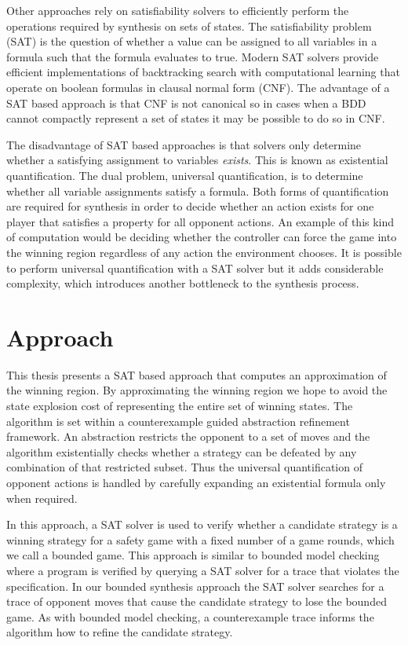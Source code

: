 Other approaches rely on satisfiability solvers to efficiently perform the operations required by synthesis on sets of states. The satisfiability problem (SAT) is the question of whether a value can be assigned to all variables in a formula such that the formula evaluates to true. Modern SAT solvers provide efficient implementations of backtracking search with computational learning that operate on boolean formulas in clausal normal form (CNF). The advantage of a SAT based approach is that CNF is not canonical so in cases when a BDD cannot compactly represent a set of states it may be possible to do so in CNF.

The disadvantage of SAT based approaches is that solvers only determine whether a satisfying assignment to variables \emph{exists}. This is known as existential quantification. The dual problem, universal quantification, is to determine whether all variable assignments satisfy a formula. Both forms of quantification are required for synthesis in order to decide whether an action exists for one player that satisfies a property for all opponent actions. An example of this kind of computation would be deciding whether the controller can force the game into the winning region regardless of any action the environment chooses. It is possible to perform universal quantification with a SAT solver but it adds considerable complexity, which introduces another bottleneck to the synthesis process.

\section{Approach}

This thesis presents a SAT based approach that computes an approximation of the winning region. By approximating the winning region we hope to avoid the state explosion cost of representing the entire set of winning states. The algorithm is set within a counterexample guided abstraction refinement framework. An abstraction restricts the opponent to a set of moves and the algorithm existentially checks whether a strategy can be defeated by any combination of that restricted subset. Thus the universal quantification of opponent actions is handled by carefully expanding an existential formula only when required.

In this approach, a SAT solver is used to verify whether a candidate strategy is a winning strategy for a safety game with a fixed number of a game rounds, which we call a bounded game. This approach is similar to bounded model checking where a program is verified by querying a SAT solver for a trace that violates the specification. In our bounded synthesis approach the SAT solver searches for a trace of opponent moves that cause the candidate strategy to lose the bounded game. As with bounded model checking, a counterexample trace informs the algorithm how to refine the candidate strategy.

